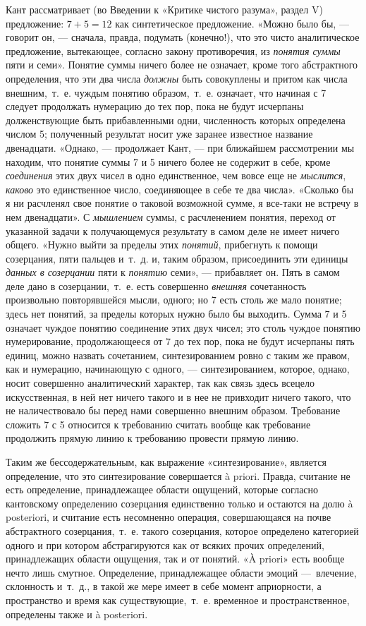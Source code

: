 {Кант рассматривает (во Введении к «Критике чистого разума», раздел V)
предложение: $7 + 5 = 12$ как синтетическое предложение. «Можно было бы, —
говорит он, — сначала, правда, подумать (конечно!), что это чисто
аналитическое предложение, вытекающее, согласно закону противоречия, из
{\em понятия суммы} пяти и семи». Понятие суммы ничего
более не означает, кроме того абстрактного определения, что эти два числа
{\em должны} быть совокуплены и притом как числа
внешним,~т.~е. чуждым понятию образом,~т.~е. означает, что начиная с 7
следует продолжать нумерацию до тех пор, пока не будут исчерпаны
долженствующие быть прибавленными одни, численность которых определена
числом 5; полученный результат носит уже заранее известное название
двенадцати. «Однако, — продолжает Кант, — при ближайшем рассмотрении мы
находим, что понятие суммы 7 и 5 ничего более не содержит в себе, кроме
{\em соединения} этих двух чисел в одно единственное,
чем вовсе еще не {\em мыслится},
{\em каково} это единственное число, соединяющее в себе
те два числа». «Сколько бы я ни расчленял свое понятие о таковой возможной
сумме, я все-таки не встречу в нем двенадцати». С
{\em мышлением} суммы, с расчленением понятия, переход
от указанной задачи к получающемуся результату в самом деле не имеет ничего
общего. «Нужно выйти за пределы этих {\em понятий},
прибегнуть к помощи созерцания, пяти пальцев и~т.~д. и, таким образом,
присоединить эти единицы {\em данных в созерцании} пяти
к {\em понятию} семи», — прибавляет он. Пять в самом
деле дано в созерцании,~т.~е. есть совершенно
{\em внешняя} сочетанность произвольно повторявшейся
мысли, одного; но 7 есть столь же мало понятие; здесь нет понятий, за
пределы которых нужно было бы выходить. Сумма 7 и 5 означает чуждое понятию
соединение этих двух чисел; это столь чуждое понятию нумерирование,
продолжающееся от 7 до тех пор, пока не будут исчерпаны пять единиц, можно
назвать сочетанием, синтезированием ровно с таким же правом, как и
нумерацию, начинающую с одного, — синтезированием, которое, однако, носит
совершенно аналитический характер, так как связь здесь всецело
искусственная, в ней нет ничего такого и в нее не привходит ничего такого,
что не наличествовало бы перед нами совершенно внешним образом. Требование
сложить 7 с 5 относится к требованию считать вообще как требование
продолжить прямую линию к требованию провести прямую линию.

Таким же бессодержательным, как выражение «синтезирование», является
определение, что это синтезирование совершается à priori. Правда, считание
не есть определение, принадлежащее области ощущений, которые согласно
кантовскому определению созерцания единственно только и остаются на долю à
posteriori, и считание есть несомненно операция, совершающаяся на почве
абстрактного созерцания,~т.~е. такого созерцания, которое определено
категорией одного и при котором абстрагируются как от всяких прочих
определений, принадлежащих области ощущения, так и от понятий. «À priori»
есть вообще нечто лишь смутное. Определение, принадлежащее области эмоций
—~влечение, склонность и~т.~д., в такой же мере имеет в себе момент
априорности, а пространство и время как существующие,~т.~е. временное и
пространственное, определены также и à posteriori.

}
